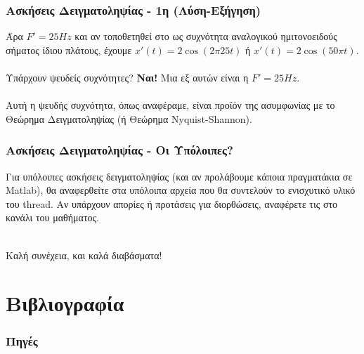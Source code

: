 \documentclass{beamer}
\begin{document}
\begin{frame}
	\frametitle{Ασκήσεις Δειγματοληψίας - 1η (Λύση-Εξήγηση)}
	Άρα $F' = 25 Hz$ και αν τοποθετηθεί στο ως συχνότητα αναλογικού ημιτονοειδούς σήματος ίδιου πλάτους, έχουμε $x'(t) = 2\cos(2\pi25t)$ ή $x'(t) = 2\cos(50\pi t)$.\\~\\
	
	Υπάρχουν ψευδείς συχνότητες? \textbf{Ναι!} Μια εξ αυτών είναι η $F' = 25Hz$. \\~\\
	
	Αυτή η ψευδής συχνότητα, όπως αναφέραμε, είναι προϊόν της ασυμφωνίας με το Θεώρημα Δειγματοληψίας (ή Θεώρημα \textlatin{Nyquist-Shannon}).
	
\end{frame}

\begin{frame}
	\frametitle{Ασκήσεις Δειγματοληψίας - Οι Υπόλοιπες?}
	Για υπόλοιπες ασκήσεις δειγματοληψίας (και αν προλάβουμε κάποια πραγματάκια σε \textlatin{Matlab}), θα αναφερθείτε στα υπόλοιπα αρχεία που θα συντελούν το ενισχυτικό υλικό του \textlatin{thread}. Αν υπάρχουν απορίες ή προτάσεις για διορθώσεις, αναφέρετε τις στο κανάλι του μαθήματος. \\~\\
	\begin{center}
		Καλή συνέχεια, και καλά διαβάσματα!
	\end{center}
	
\end{frame}
\section{Βιβλιογραφία}

		\begin{frame}
		\frametitle{Πηγές}


\nocite{*}
		\end{frame}
\end{document}
